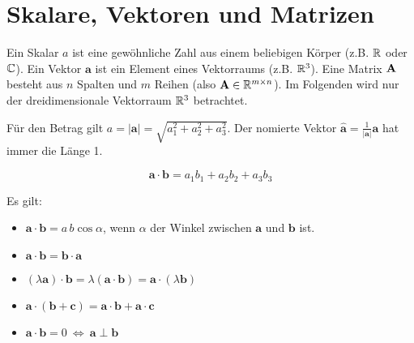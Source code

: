 \iffalse \begin{enumerate}
	\item Recheneigenschaften von Vektoren und Skalaren
	\item Koordinatentransformationen
	\item Rechenregeln von Matrizen
	\item Determinante mit Rechenregeln
	\item Eigenwerte und Eigenvektoren
	\item Eulersche Formel
	\item Taylorreihe
	\item Fourier Reihe
	\item Dirac Delta Funktion
	\item Fourier Transformation
\end{enumerate}\fi

\section{Skalare, Vektoren und Matrizen}

Ein Skalar $a$ ist eine gewöhnliche Zahl aus einem beliebigen Körper (z.B. $\mathbb{R}$ oder $\mathbb{C}$). Ein Vektor $\mathbf{a}$ ist ein Element eines Vektorraums (z.B. $\mathbb{R}^3$). Eine Matrix $\bf{A}$ besteht aus $n$ Spalten und $m$ Reihen (also $\mathbf{A} \in \mathbb{R}^{m\times n}$). Im Folgenden wird nur der dreidimensionale Vektorraum $\mathbb{R}^3$ betrachtet.

Für den Betrag gilt $a = |\mathbf{a}| = \sqrt{a_1^2 + a_2^2 + a_3^2}$. Der nomierte Vektor $\mathbf{\hat{a}} = \frac{1}{|\mathbf{a}|} \mathbf{a}$ hat immer die Länge 1. 

\begin{frameddefn}[Skalarprodukt]
	\[\mathbf{a}\cdot \mathbf{b} = a_1 b_1 + a_2 b_2 + a_3 b_3\]
\end{frameddefn}

Es gilt:

\begin{itemize}
	\item $\mathbf{a}\cdot \mathbf{b} = a\, b \cos\alpha$, wenn $\alpha$ der Winkel zwischen $\mathbf{a}$ und $\mathbf{b}$ ist.
	\item $\mathbf{a}\cdot \mathbf{b} = \mathbf{b}\cdot \mathbf{a}$
	\item $(\lambda \mathbf{a})\cdot \mathbf{b} = \lambda (\mathbf{a}\cdot \mathbf{b}) = \mathbf{a}\cdot ( \lambda \mathbf{b})$
	\item $\mathbf{a}\cdot (\mathbf{b} + \mathbf{c}) = \mathbf{a}\cdot \mathbf{b} + \mathbf{a}\cdot \mathbf{c}$
	\item $\mathbf{a}\cdot \mathbf{b} = 0 \ \iff\ \mathbf{a}\perp \mathbf{b}$
\end{itemize}


